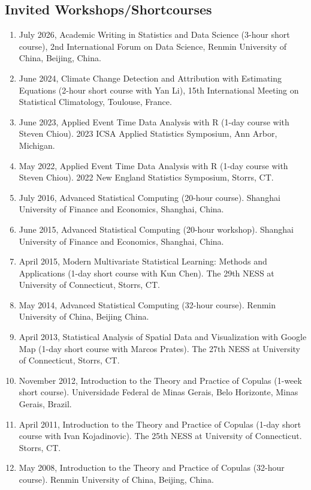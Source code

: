 \documentclass[Statistics]{vita}
\begin{document}
\begin{vita}
  \subsection{Invited Workshops/Shortcourses}
  \begin{enumerate}
  \item July 2026, Academic Writing in Statistics and Data Science (3-hour short course), 2nd International Forum on Data Science, Renmin University of China, Beijing, China. 
  \item June 2024, Climate Change Detection and Attribution with Estimating Equations (2-hour short course with Yan Li), 15th International Meeting on Statistical Climatology, Toulouse, France.
  \item June 2023, Applied Event Time Data Analysis with R (1-day course with Steven Chiou). 2023 ICSA Applied Statistics Symposium, Ann Arbor, Michigan.
  \item May 2022, Applied Event Time Data Analysis with R (1-day course with Steven Chiou). 2022 New England Statistics Symposium, Storrs, CT.
  \item July 2016, Advanced Statistical Computing (20-hour course). Shanghai University of Finance and Economics, Shanghai, China.
  \item June 2015, Advanced Statistical Computing (20-hour workshop). Shanghai University of Finance and Economics, Shanghai, China.
  \item April 2015, Modern Multivariate Statistical Learning: Methods and Applications (1-day short course with Kun Chen). The 29th NESS at University of Connecticut, Storrs, CT.
  \item May 2014, Advanced Statistical Computing (32-hour course). Renmin University of China, Beijing China.
  \item April 2013, Statistical Analysis of Spatial Data and Visualization with Google Map (1-day short course with Marcos Prates). The 27th NESS at University of Connecticut, Storrs, CT.
  \item November 2012, Introduction to the Theory and Practice of Copulas (1-week short course). Universidade Federal de Minas Gerais, Belo Horizonte, Minas Gerais, Brazil.
  \item April 2011, Introduction to the Theory and Practice of Copulas (1-day short course with Ivan Kojadinovic). The 25th NESS at University of Connecticut. Storrs, CT.
  \item May 2008, Introduction to the Theory and Practice of Copulas (32-hour course). Renmin University of China, Beijing, China.
  \end{enumerate}
\end{vita}
\end{document}
